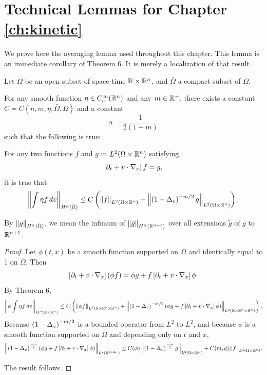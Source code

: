 
\section{Technical Lemmas for Chapter \ref{ch:kinetic}} \label{sec:appendix}

We prove here the averaging lemma used throughout this chapter.  
This lemma is an immediate corollary of \cite{Be} Theorem 6.  It is merely a localization of that result.  
\begin{lemma}\label{thm:avg_lemma}
Let $\Omega$ be an open subset of space-time $\mathbb{R} \times \mathbb{R}^n$, and $\bar{\Omega}$ a compact subset of $\Omega$.  

For any smooth function $\eta \in C_c^\infty(\mathbb{R}^n)$ and any $m \in \mathbb{R}^+$, there exists a constant $C = C(n,m,\eta, \bar{\Omega}, \Omega)$ and a constant
\[ \alpha = \frac{1}{2(1+m)} \]
such that the following is true:

For any two functions $f$ and $g$ in $L^2(\Omega \times \mathbb{R}^n)$ satisfying
\[ \left[ \partial_t + v\cdot \nabla_x \right] f = g, \]
it is true that
\[ \left\lVert\int \eta f \,dv\right\rVert_{H^\alpha(\bar{\Omega})} \leq C \left( \left\lVert f\right\rVert_{L^2(\Omega \times \mathbb{R}^n)} + \left\lVert\left( 1-\Delta_v \right)^{-m/2} g\right\rVert_{L^2(\Omega\times\mathbb{R}^n)} \right). \]
%
\end{lemma}

By $\left\lVert g\right\rVert_{H^\alpha(\bar{\Omega})}$, we mean the infimum of $\left\lVert\tilde{g}\right\rVert_{H^\alpha(\mathbb{R}^{n+1})}$ over all extensions $\tilde{g}$ of $g$ to $\mathbb{R}^{n+1}$.  

\begin{proof}
Let $\phi(t,x)$ be a smooth function supported on $\Omega$ and identically equal to 1 on $\bar{\Omega}$.  Then
\[ \left[ \partial_t + v\cdot \nabla_x \right] (\phi f) = \phi g + f \left[ \partial_t + v\cdot \nabla_x \right] \phi. \]
By \cite{Be} Theorem 6,
\[ \left\lVert\phi \int \eta f \,dv\right\rVert_{H^\alpha(\mathbb{R} \times \mathbb{R}^n)} \leq C \left( \left\lVert\phi f\right\rVert_{L^2(\mathbb{R} \times \mathbb{R}^n \times \mathbb{R}^n)} + \left\lVert\left( 1-\Delta_v \right)^{-m/2} \left( \phi g + f \left[ \partial_t + v\cdot \nabla_x \right] \phi \right)\right\rVert_{L^2(\mathbb{R} \times \mathbb{R}^n \times \mathbb{R}^n)} \right). \]
Because $\left( 1-\Delta_v \right)^{-m/2}$ is a bounded operator from $L^2$ to $L^2$, and because $\phi$ is a smooth function supported on $\Omega$ and depending only on $t$ and $x$, 
\[ \left\lVert\left( 1-\Delta_v \right)^{\frac{-m}{2}} \left( \phi g + f \left[ \partial_t + v\cdot \nabla_x \right] \phi \right)\right\rVert_{L^2(\mathbb{R}^{1+2n})} \leq C(\phi) \left\lVert\left( 1-\Delta_v \right)^{\frac{-m}{2}}g\right\rVert_{L^2(\Omega\times \mathbb{R}^n)} + C(m,\phi)\! \left\lVert f\right\rVert_{L^2(\Omega\times\mathbb{R}^n)}\!. \]

The result follows.  
\end{proof}


